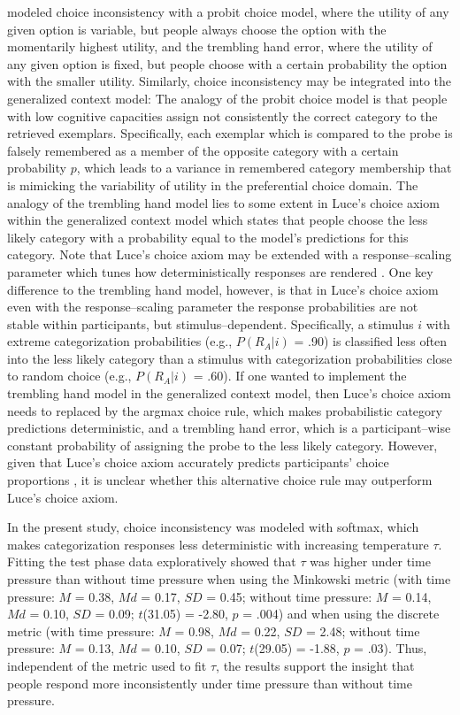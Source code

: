 \documentclass[a4paper,man,natbib]{apa6}
\begin{document}
\cite{olschewski2018taxing} modeled choice inconsistency with a probit choice model, where the utility of any given option is variable, but people always choose the option with the momentarily highest utility, and the trembling hand error, where the utility of any given option is fixed, but people choose with a certain probability the option with the smaller utility. 
Similarly, choice inconsistency may be integrated into the generalized context model: The analogy of the probit choice model is that people with low cognitive capacities assign not consistently the correct category to the retrieved exemplars. Specifically, each exemplar which is compared to the probe is falsely remembered as a member of the opposite category with a certain probability $p$, which leads to a variance in remembered category membership that is mimicking the variability of utility in the preferential choice domain. The analogy of the trembling hand model lies to some extent in Luce's choice axiom within the generalized context model which states that people choose the less likely category with a probability equal to the model's predictions for this category. Note that Luce's choice axiom may be extended with a response--scaling parameter which tunes how deterministically responses are rendered \citep{nosofsky2002exemplar, nosofsky2011generalized, ashby1993relations}. One key difference to the trembling hand model, however, is that in Luce's choice axiom even with the response--scaling parameter the response probabilities are not stable within participants, but stimulus--dependent. Specifically, a stimulus $i$ with extreme categorization probabilities (e.g., $P(R_{A}|i)$ = .90) is classified less often into the less likely category than a stimulus with categorization probabilities close to random choice (e.g., $P(R_{A}|i)$ = .60). If one wanted to implement the trembling hand model in the generalized context model, then Luce's choice axiom needs to replaced by the argmax choice rule, which makes probabilistic category predictions deterministic, and a trembling hand error, which is a participant--wise constant probability of assigning the probe to the less likely category. However, given that Luce's choice axiom accurately predicts participants' choice proportions \citep{nosofsky1987attention, mckinley1995investigations, lamberts2000information}, it is unclear whether this alternative choice rule may outperform Luce's choice axiom. 

In the present study, choice inconsistency was modeled with softmax, which makes categorization responses less deterministic with increasing temperature $\tau$. Fitting the test phase data exploratively showed that $\tau$ was higher under time pressure than without time pressure when using the Minkowski metric (with time pressure: $M$ = 0.38, $Md$ = 0.17, $SD$ = 0.45; without time pressure: $M$ = 0.14, $Md$ = 0.10, $SD$ = 0.09; $t$(31.05) = -2.80, $p$ = .004) and when using the discrete metric (with time pressure: $M$ = 0.98, $Md$ = 0.22, $SD$ = 2.48; without time pressure: $M$ = 0.13, $Md$ = 0.10, $SD$ = 0.07; $t$(29.05) = -1.88, $p$ = .03). Thus, independent of the metric used to fit $\tau$, the results support the insight that people respond more inconsistently under time pressure than without time pressure.
\end{document}
